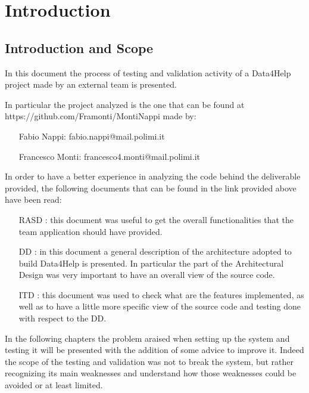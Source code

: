 \section{Introduction}

\subsection{Introduction and Scope}

In this document the process of testing and validation activity of a Data4Help project made by an external team is presented.

In particular the project analyzed is the one that can be found at
https://github.com/Framonti/MontiNappi made by:
\begin{itemize}
\item[] Fabio Nappi: fabio.nappi@mail.polimi.it
\item[] Francesco Monti: francesco4.monti@mail.polimi.it
\end{itemize}

In order to have a better experience in analyzing the code behind the deliverable provided, the following documents that can be found in the link provided above have been read:
\begin{itemize}
\item[RASD]: this document was useful to get the overall functionalities that the team application should have provided.
\item[DD]: in this document a general description of the architecture adopted to build Data4Help is presented. In particular the part of the Architectural Design was very important to have an overall view of the source code.
\item[ITD]: this document was used to check what are the features implemented, as well as to have a little more specific view of the source code and testing done with respect to the DD.
\end{itemize}


In the following chapters the problem araised when setting up the system and testing it will be presented with the addition of some advice to improve it. 
Indeed the scope of the testing and validation was not to break the system, but rather recognizing its main weaknesses and understand how those weaknesses could be avoided or at least limited. 